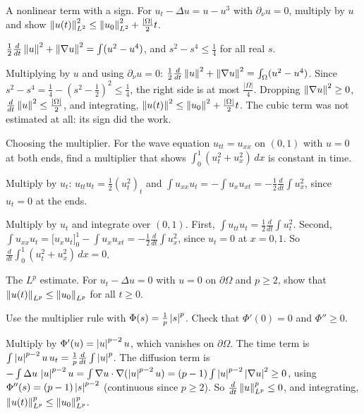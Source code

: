 \begin{exercise}
  A nonlinear term with a sign. For $u_t - \Delta u = u - u^3$ with $\partial_\nu u = 0$, multiply by $u$ and show $\left\lVert u(t)\right\rVert_{L^2}^2 \le \left\lVert u_0\right\rVert_{L^2}^2 + \frac{|\Omega|}{2}t$.
  \begin{hint}
    $\frac12\frac{d}{dt}\left\lVert u\right\rVert^2 + \left\lVert \nabla u\right\rVert^2 = \int(u^2 - u^4)$, and $s^2 - s^4 \le \frac14$ for all real $s$.
  \end{hint}
  \begin{solution}
    Multiplying by $u$ and using $\partial_\nu u = 0$: $\frac12\frac{d}{dt}\left\lVert u\right\rVert^2 + \left\lVert \nabla u\right\rVert^2 = \int_\Omega(u^2 - u^4)$. Since $s^2 - s^4 = \frac14 - (s^2 - \frac12)^2 \le \frac14$, the right side is at most $\frac{|\Omega|}{4}$. Dropping $\left\lVert \nabla u\right\rVert^2 \ge 0$, $\frac{d}{dt}\left\lVert u\right\rVert^2 \le \frac{|\Omega|}{2}$, and integrating, $\left\lVert u(t)\right\rVert^2 \le \left\lVert u_0\right\rVert^2 + \frac{|\Omega|}{2}t$. The cubic term was not estimated at all: its sign did the work.
  \end{solution}
\end{exercise}

\begin{exercise}
  Choosing the multiplier. For the wave equation $u_{tt} = u_{xx}$ on $(0,1)$ with $u = 0$ at both ends, find a multiplier that shows $\int_0^1 (u_t^2 + u_x^2)\,dx$ is constant in time.
  \begin{hint}
    Multiply by $u_t$: $u_{tt}u_t = \frac12(u_t^2)_t$ and $\int u_{xx}u_t = -\int u_x u_{xt} = -\frac12\frac{d}{dt}\int u_x^2$, since $u_t = 0$ at the ends.
  \end{hint}
  \begin{solution}
    Multiply by $u_t$ and integrate over $(0,1)$. First, $\int u_{tt}u_t = \frac12\frac{d}{dt}\int u_t^2$. Second, $\int u_{xx}u_t = \big[u_xu_t\big]_0^1 - \int u_xu_{xt} = -\frac12\frac{d}{dt}\int u_x^2$, since $u_t = 0$ at $x = 0, 1$. So $\frac{d}{dt}\int_0^1(u_t^2 + u_x^2)\,dx = 0$.
  \end{solution}
\end{exercise}

\begin{exercise}
  The $L^p$ estimate. For $u_t - \Delta u = 0$ with $u = 0$ on $\partial\Omega$ and $p \ge 2$, show that $\left\lVert u(t)\right\rVert_{L^p} \le \left\lVert u_0\right\rVert_{L^p}$ for all $t \ge 0$.
  \begin{hint}
    Use the multiplier rule with $\Phi(s) = \frac1p\left\lvert s\right\rvert^p$. Check that $\Phi'(0) = 0$ and $\Phi'' \ge 0$.
  \end{hint}
  \begin{solution}
    Multiply by $\Phi'(u) = \left\lvert u\right\rvert^{p-2}u$, which vanishes on $\partial\Omega$. The time term is $\int \left\lvert u\right\rvert^{p-2}u\,u_t = \frac1p\frac{d}{dt}\int\left\lvert u\right\rvert^p$. The diffusion term is $-\int \Delta u\,\left\lvert u\right\rvert^{p-2}u = \int \nabla u\cdot\nabla(\left\lvert u\right\rvert^{p-2}u) = (p-1)\int\left\lvert u\right\rvert^{p-2}\left\lvert \nabla u\right\rvert^2 \ge 0$, using $\Phi''(s) = (p-1)\left\lvert s\right\rvert^{p-2}$ (continuous since $p \ge 2$). So $\frac{d}{dt}\left\lVert u\right\rVert_{L^p}^p \le 0$, and integrating, $\left\lVert u(t)\right\rVert_{L^p}^p \le \left\lVert u_0\right\rVert_{L^p}^p$.
  \end{solution}
\end{exercise}


